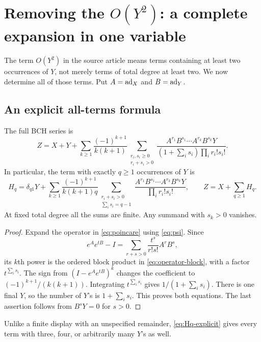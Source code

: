 \section{Removing the \texorpdfstring{$O(Y^2)$}{O(Y2)}: a complete expansion in one variable}\label{sec:y-expansion}
The term $O(Y^2)$ in the source article means terms containing at least two occurrences of $Y$, not merely terms of total degree at least two. We now determine all of those terms. Put $A=\operatorname{ad}_X$ and $B=\operatorname{ad}_Y$.

\subsection{An explicit all-terms formula}
\begin{theorem}\label{thm:operator-block}
The full BCH series is
\begin{equation}\label{eq:operator-block}
 \boxed{\displaystyle
 Z=X+Y+\sum_{k\geq1}\frac{(-1)^{k+1}}{k(k+1)}
 \sum_{\substack{r_i,s_i\geq0\\r_i+s_i>0}}
 \frac{A^{r_1}B^{s_1}\cdots A^{r_k}B^{s_k}Y}
 {(1+\sum_i s_i)\prod_i r_i!s_i!}.}
\end{equation}
In particular, the term with exactly $q\geq1$ occurrences of $Y$ is
\begin{equation}\label{eq:Hq-explicit}
 H_q=\delta_{q1}Y+
 \sum_{k\geq1}\frac{(-1)^{k+1}}{k(k+1)q}
 \sum_{\substack{r_i+s_i>0\\\sum_i s_i=q-1}}
 \frac{A^{r_1}B^{s_1}\cdots A^{r_k}B^{s_k}Y}
 {\prod_i r_i!s_i!},
 \qquad Z=X+\sum_{q\geq1}H_q.
\end{equation}
At fixed total degree all the sums are finite. Any summand with $s_k>0$ vanishes.
\end{theorem}
\begin{proof}
Expand the operator in \cref{eq:poincare} using \cref{eq:psi}. Since
\[
 e^Ae^{tB}-I
 =\sum_{r+s>0}\frac{t^s}{r!s!}A^rB^s,
\]
its $k$th power is the ordered block product in \cref{eq:operator-block}, with a factor $t^{\sum_i s_i}$. The sign from $(I-e^Ae^{tB})^k$ changes the coefficient to $(-1)^{k+1}/(k(k+1))$. Integrating $t^{\sum_i s_i}$ gives $1/(1+\sum_i s_i)$. There is one final $Y$, so the number of $Y$'s is $1+\sum_i s_i$. This proves both equations. The last assertion follows from $B^sY=0$ for $s>0$.
\end{proof}
Unlike a finite display with an unspecified remainder, \cref{eq:Hq-explicit} gives every term with three, four, or arbitrarily many $Y$'s as well.

